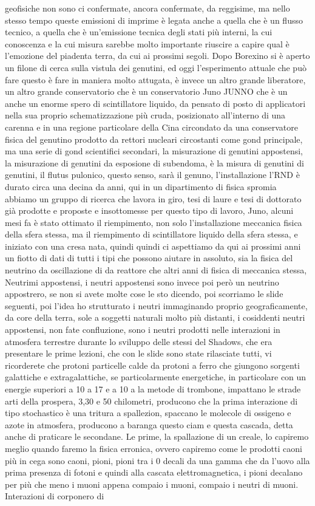 geofisiche non sono ci confermate, ancora confermate, da reggisime, ma nello stesso tempo queste emissioni di imprime è legata anche a quella che è un flusso tecnico, a quella che è un'emissione tecnica degli stati più interni, la cui conoscenza e la cui misura sarebbe molto importante riuscire a capire qual è l'emozione del piadenta terra, da cui ai prossimi segoli. Dopo Borexino si è aperto un filone di cerca sulla vistula dei genutini, ed oggi l'esperimento attuale che può fare questo è fare in maniera molto attugata, è invece un altro grande liberatore, un altro grande conservatorio che è un conservatorio Juno JUNNO che è un anche un enorme spero di scintillatore liquido, da pensato di posto di applicatori nella sua proprio schematizzazione più cruda, posizionato all'interno di una carenna e in una regione particolare della Cina circondato da una conservatore fisica del genutino prodotto da rettori nucleari circostanti come gond principale, ma una serie di gond scientifici secondari, la misurazione di genutini appostensi, la misurazione di genutini da esposione di subendoma, è la misura di genutini di genutini, il flutus pulonico, questo senso, sarà il genuno, l'installazione l'RND è durato circa una decina da anni, qui in un dipartimento di fisica spromia abbiamo un gruppo di ricerca che lavora in giro, tesi di laure e tesi di dottorato già prodotte e proposte e insottomesse per questo tipo di lavoro, Juno, alcuni mesi fa è stato ottimato il riempimento, non solo l'installazione meccanica fisica della sfera stessa, ma il riempimento di scintillatore liquido della sfera stessa, e iniziato con una cresa nata, quindi quindi ci aspettiamo da qui ai prossimi anni un fiotto di dati di tutti i tipi che possono aiutare in assoluto, sia la fisica del neutrino da oscillazione di da reattore che altri anni di fisica di meccanica stessa, Neutrimi appostensi, i neutri appostensi sono invece poi però un neutrino appostrero, se non si avete molte cose le sto dicendo, poi scorriamo le slide seguenti, poi l'idea ho strutturato i neutri immaginando proprio geograficamente, da core della terra, sole a soggetti naturali molto più distanti, i cosiddenti neutri appostensi, non fate confluzione, sono i neutri prodotti nelle interazioni in atmosfera terrestre durante lo sviluppo delle stessi del Shadows, che era presentare le prime lezioni, che con le slide sono state rilasciate tutti, vi ricorderete che protoni particelle calde da protoni a ferro che giungono sorgenti galattiche e extragalattiche, se particolarmente energetiche, in particolare con un energie superiori a 10 a 17 e a 10 a la metode di trombone, impattano le strade arti della prospera, 3,30 e 50 chilometri, producono che la prima interazione di tipo stochastico è una tritura a spallezion, spaccano le molecole di ossigeno e azote in atmosfera, producono a baranga questo ciam e questa cascada, detta anche di praticare le secondane. Le prime, la spallazione di un creale, lo capiremo meglio quando faremo la fisica erronica, ovvero capiremo come le prodotti caoni più in cega sono caoni, pioni, pioni tra i 0 decali da una gamma che da l'uovo alla prima presenza di fotoni e quindi alla cascata elettromagnetica, i pioni decalano per più che meno i muoni appena compaio i muoni, compaio i neutri di muoni. Interazioni di corponero di 